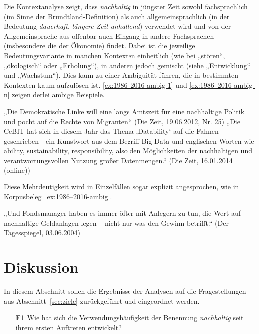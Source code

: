 \documentclass[
    german,
    a4paper,%
    12pt,%
    oneside,%
    toc=bibliography,
    final,
]{scrartcl}
\begin{document}
Die Kontextanalyse zeigt, dass \textit{nachhaltig} in jüngster Zeit sowohl fachsprachlich (im Sinne der Brundtland-Definition) als auch allgemeinsprachlich (in der Bedeutung \textit{dauerhaft}, \textit{längere Zeit anhaltend}) verwendet wird und von der Allgemeinsprache aus offenbar auch Eingang in andere Fachsprachen (insbesondere die der Ökonomie) findet. Dabei ist die jeweilige Bedeutungsvariante in manchen Kontexten einheitlich (wie bei „stören“, „ökologisch“ oder „Erholung“), in anderen jedoch gemischt (siehe „Entwicklung“ und „Wachstum“). Dies kann zu einer Ambiguität führen, die in bestimmten Kontexten kaum aufzulösen ist. \ref{ex:1986–2016-ambig-1} und \ref{ex:1986–2016-ambig-n} zeigen derlei ambige Beispiele.

\begin{exe}
\ex\label{ex:1986–2016-ambig-1} „Die Demokratische Linke will eine lange Amtszeit für eine nachhaltige Politik und pocht auf die Rechte von Migranten.“ (Die Zeit, 19.06.2012, Nr. 25)
\ex\label{ex:1986–2016-ambig-n} „Die CeBIT hat sich in diesem Jahr das Thema ‚Datability‘ auf die Fahnen geschrieben - ein Kunstwort aus dem Begriff Big Data und englischen Worten wie ability, sustainability, responsibility, also den Möglichkeiten der nachhaltigen und verantwortungsvollen Nutzung großer Datenmengen.“ (Die Zeit, 16.01.2014 (online))
\end{exe}

Diese Mehrdeutigkeit wird in Einzelfällen sogar explizit angesprochen, wie in Korpusbeleg~\ref{ex:1986–2016-ambig}.

\begin{exe}
\ex\label{ex:1986–2016-ambig} „Und Fondsmanager haben es immer öfter mit Anlegern zu tun, die Wert auf nachhaltige Geldanlagen legen – nicht nur was den Gewinn betrifft.“ (Der Tagesspiegel, 03.06.2004)
\end{exe}

\section{Diskussion}
\label{sec:diskussion}

In diesem Abschnitt sollen die Ergebnisse der Analysen auf die Fragestellungen aus Abschnitt~\ref{sec:ziele} zurückgeführt und eingeordnet werden.

\begin{enumerate}[rightmargin=1cm]
\item[\textbf{F1}] Wie hat sich die Verwendungshäufigkeit der Benennung \textit{nachhaltig} seit ihrem ersten Auftreten entwickelt?
\end{enumerate}
\end{document}
